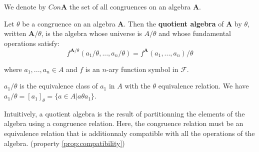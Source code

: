 \begin{notation} We denote by $Con \boldsymbol{A}$ the set of all congruences on
an algebra $\boldsymbol{A}$.
\end{notation}

\begin{definition} Let $\theta$ be a congruence on an algebra
$\boldsymbol{A}$. Then the \textbf{quotient algebra} of $\boldsymbol{A}$ by
$\theta$, written $\boldsymbol{A} / \theta$, is the algebra whose universe is $A
/ \theta$ and whose fundamental operations satisfy:
  \begin{equation} f^{\boldsymbol{A} / \theta} (a_1 / \theta, ..., a_n / \theta)
= f^{\boldsymbol{A}} (a_1, ..., a_n) / \theta
  \end{equation}

  where $a_1,...,a_n \in A$ and $f$ is an $n$-ary function symbol in
$\mathcal{F}$.
\end{definition}

\begin{remark}
  $a_1 / \theta$ is the equivalence class of $a_1$ in $A$ with the $\theta$ equivalence relation. We have
  $a_1 / \theta = [a_1]_{\theta} = \{a \in A | a \theta a_1\}$.
\end{remark}

\begin{remark} Intuitively, a quotient algebra is the result of partitionning
the elements of the algebra using a congruence relation. Here, the congruence
relation must be an equivalence relation that is additionnaly compatible with
all the operations of the algebra. (property \ref{prop:compatibility})
\end{remark}

